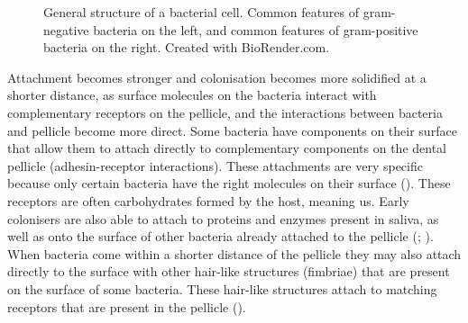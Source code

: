 \documentclass[
  b5paper,
]{book}
\begin{document}
\begin{figure}


\caption{\label{fig-bacterial-structure}General structure of a bacterial
cell. Common features of gram-negative bacteria on the left, and common
features of gram-positive bacteria on the right. Created with
BioRender.com.}

\end{figure}%

Attachment becomes stronger and colonisation becomes more solidified at
a shorter distance, as surface molecules on the bacteria interact with
complementary receptors on the pellicle, and the interactions between
bacteria and pellicle become more direct. Some bacteria have components
on their surface that allow them to attach directly to complementary
components on the dental pellicle (adhesin-receptor interactions). These
attachments are very specific because only certain bacteria have the
right molecules on their surface
(). These
receptors are often carbohydrates formed by the host, meaning us. Early
colonisers are also able to attach to proteins and enzymes present in
saliva, as well as onto the surface of other bacteria already attached
to the pellicle (; ). When bacteria come within a shorter distance of the pellicle
they may also attach directly to the surface with other hair-like
structures (fimbriae) that are present on the surface of some bacteria.
These hair-like structures attach to matching receptors that are present
in the pellicle ().
\end{document}
